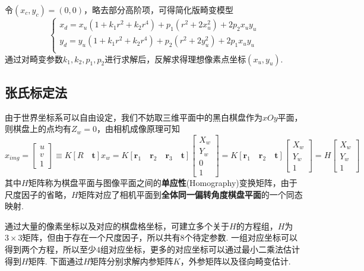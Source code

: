 \documentclass[12pt, a4paper, oneside]{ctexart}
\numberwithin{equation}{section}  %
\def\bd{\boldsymbol}        %
\begin{document}
令$(x_c,y_c)=(0,0)$，略去部分高阶项，可得简化版畸变模型
\begin{equation}
    \label{eq-简化畸变模型}
    \begin{cases}
        x_d=x_u(1+k_1r^2+k_2r^4)+p_1(r^2+2x_u^2)+2p_2x_uy_u\\
        y_d=y_u(1+k_1r^2+k_2r^4)+p_2(r^2+2y_u^2)+2p_1x_uy_u\\
    \end{cases}
\end{equation}
通过对畸变参数$k_1,k_2,p_1,p_2$进行求解后，反解求得理想像素点坐标$(x_u,y_u)$.
\subsection{张氏标定法}
由于世界坐标系可以自由设定，我们不妨取三维平面中的黑白棋盘作为$xOy$平面，则棋盘上的点均有$Z_w = 0$，由相机成像原理可知
\begin{equation*}
    x_{img} = \left[\begin{matrix}
        u\\v\\1
    \end{matrix}\right]\equiv K[R\quad \bd{t}]x_w = K[\bd{r}_1\quad \bd{r}_2\quad \bd{r}_3\quad \bd{t}]\left[\begin{matrix}
        X_w\\Y_w\\0\\1
    \end{matrix}\right] = K[\bd{r}_1\quad \bd{r}_2\quad \bd{t}]\left[\begin{matrix}
        X_w\\Y_w\\1
    \end{matrix}\right] = H\left[\begin{matrix}
        X_w\\Y_w\\1
    \end{matrix}\right]
\end{equation*}
其中$H$矩阵称为棋盘平面与图像平面之间的\textbf{单应性}(Homography)变换矩阵，由于尺度因子的省略，$H$矩阵对应了相机平面到\textbf{全体同一偏转角度棋盘平面}的一个同态映射.

通过大量的像素坐标以及对应的棋盘格坐标，可建立多个关于$H$的方程组，$H$为$3\times 3$矩阵，但由于存在一个尺度因子，所以共有$8$个待定参数. 一组对应坐标可以得到两个方程，所以至少$4$组对应坐标，更多的对应坐标可以通过最小二乘法估计得到$H$矩阵. 下面通过$H$矩阵分别求解内参矩阵$K$，外参矩阵以及径向畸变估计.
\end{document}
